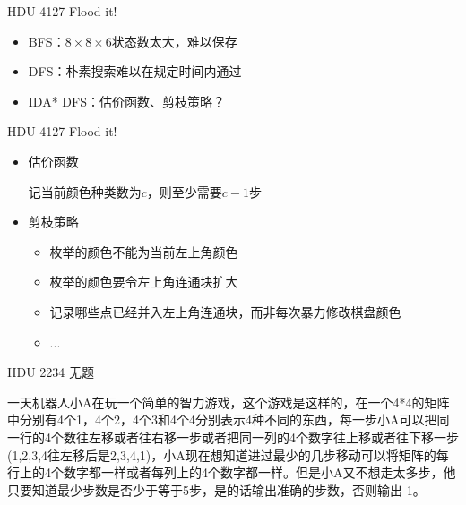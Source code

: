 \documentclass{beamer}
\begin{document}
\begin{frame}{HDU 4127 Flood-it!}

    \begin{itemize}
        \item BFS：$8\times8\times6$状态数太大，难以保存
        \item DFS：朴素搜索难以在规定时间内通过
        \item IDA* DFS：估价函数、剪枝策略？
    \end{itemize}
    
\end{frame}

\begin{frame}{HDU 4127 Flood-it!}

    \begin{itemize}
        \item 估价函数
        
            记当前颜色种类数为$c$，则至少需要$c-1$步
        
        \item 剪枝策略
        \begin{itemize}
            \item 枚举的颜色不能为当前左上角颜色
            \item 枚举的颜色要令左上角连通块扩大
            \item 记录哪些点已经并入左上角连通块，而非每次暴力修改棋盘颜色
            \item ...
        \end{itemize}
    \end{itemize}
    
\end{frame}

\begin{frame}{HDU 2234 无题}

    一天机器人小A在玩一个简单的智力游戏，这个游戏是这样的，在一个4*4的矩阵中分别有4个1，4个2，4个3和4个4分别表示4种不同的东西，每一步小A可以把同一行的4个数往左移或者往右移一步或者把同一列的4个数字往上移或者往下移一步(1,2,3,4往左移后是2,3,4,1)，小A现在想知道进过最少的几步移动可以将矩阵的每行上的4个数字都一样或者每列上的4个数字都一样。但是小A又不想走太多步，他只要知道最少步数是否少于等于5步，是的话输出准确的步数，否则输出-1。
    
\end{frame}
\end{document}
